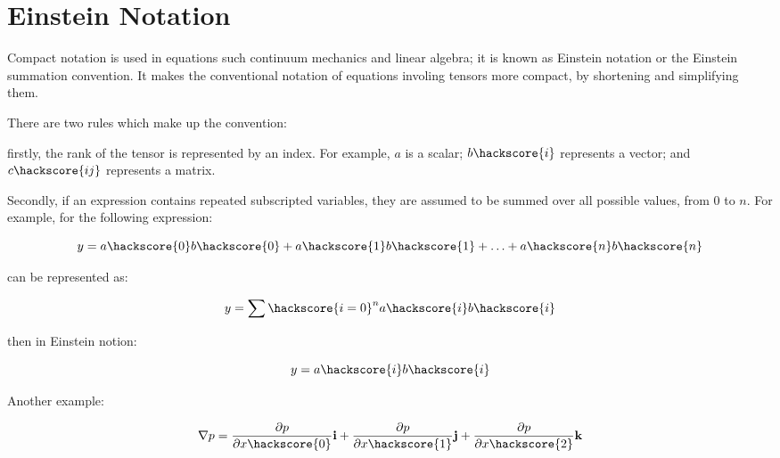 
%
%
%


\section{Einstein Notation}
\label{EINSTEIN NOTATION}

Compact notation is used in equations such continuum mechanics and linear algebra; it is known as Einstein notation or the Einstein summation convention. It makes the conventional notation of equations involing tensors more compact, by shortening and simplifying them.

There are two rules which make up the convention:

firstly, the rank of the tensor is represented by an index. For example, $a$ is a scalar; $b\hackscore{i}$ represents a vector; and $c\hackscore{ij}$ represents a matrix.

Secondly, if an expression contains repeated subscripted variables, they are assumed to be summed over all possible values, from $0$ to $n$. For example, for the following expression:



\begin{equation}
y = a\hackscore{0}b\hackscore{0} + a\hackscore{1}b\hackscore{1} + \ldots + a\hackscore{n}b\hackscore{n}
\label{NOTATION1}
\end{equation}

can be represented as:

\begin{equation}
y = \sum\hackscore{i=0}^n  a\hackscore{i}b\hackscore{i}
\label{NOTATION2}
\end{equation}

then in Einstein notion:

\begin{equation}
y = a\hackscore{i}b\hackscore{i}
\label{NOTATION3}
\end{equation}

Another example:

\begin{equation}
\nabla p = \frac{\partial p}{\partial x\hackscore{0}}\textbf{i} + \frac{\partial p}{\partial x\hackscore{1}}\textbf{j} + \frac{\partial p}{\partial x\hackscore{2}}\textbf{k}
\label{NOTATION4}
\end{equation}

